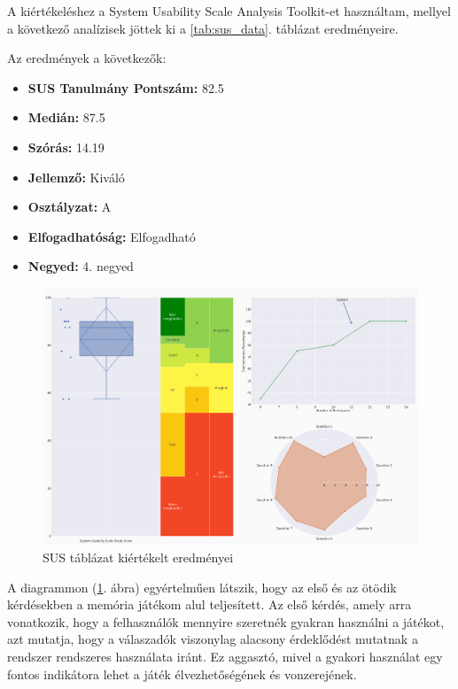A kiértékeléshez a System Usability Scale Analysis Toolkit-et \cite{SUSAnaly62:online} használtam, mellyel a következő analízisek jöttek ki a \ref{tab:sus_data}. táblázat eredményeire. 

Az eredmények a következők: 
\begin{itemize}
    \item \textbf{SUS Tanulmány Pontszám:} 82.5
    \item \textbf{Medián:} 87.5
    \item \textbf{Szórás:} 14.19
    \item \textbf{Jellemző:} Kiváló
    \item \textbf{Osztályzat:} A
    \item \textbf{Elfogadhatóság:} Elfogadható
    \item \textbf{Negyed:} 4. negyed
\end{itemize}

\begin{figure}[h]
    \center
    \includegraphics[width=\textwidth]{img/single_study_plot.png}
    \caption{SUS táblázat kiértékelt eredményei}
    \label{diag:sus_result}
\end{figure}

A diagrammon (\ref{diag:sus_result}. ábra) egyértelműen látszik, hogy az első és az ötödik kérdésekben a memória játékom alul teljesített. Az első kérdés, amely arra vonatkozik, hogy a felhasználók mennyire szeretnék gyakran használni a játékot, azt mutatja, hogy a válaszadók viszonylag alacsony érdeklődést mutatnak a rendszer rendszeres használata iránt. Ez aggasztó, mivel a gyakori használat egy fontos indikátora lehet a játék élvezhetőségének és vonzerejének.

